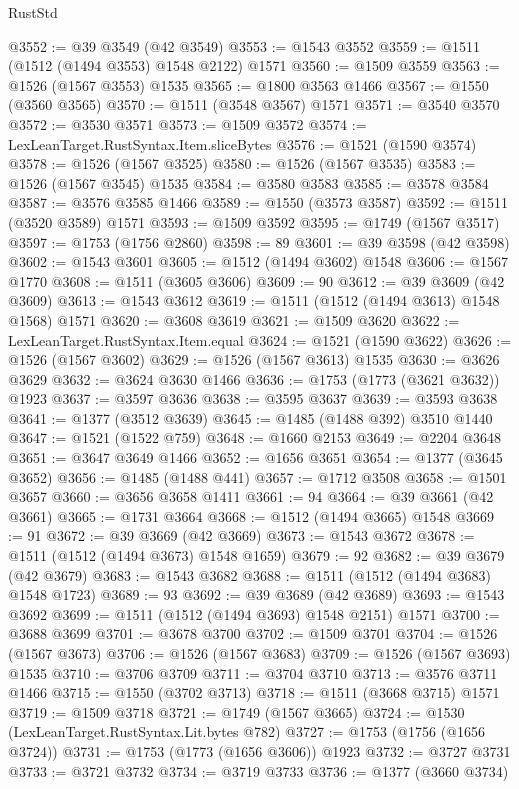\begin{lexlean}{RustStd}
\begin{coremodule}
{\begin{coremodule}
{{{{{{{{{{{{{{{{{{{{{{{{{{{{{{{{{{{@3552 := @39 @3549 (@42 @3549)
@3553 := @1543 @3552
@3559 := @1511 (@1512 (@1494 @3553) @1548 @2122) @1571
@3560 := @1509 @3559
@3563 := @1526 (@1567 @3553) @1535
@3565 := @1800 @3563 @1466
@3567 := @1550 (@3560 @3565)
@3570 := @1511 (@3548 @3567) @1571
@3571 := @3540 @3570
@3572 := @3530 @3571
@3573 := @1509 @3572
@3574 := LexLeanTarget.RustSyntax.Item.sliceBytes
@3576 := @1521 (@1590 @3574)
@3578 := @1526 (@1567 @3525)
@3580 := @1526 (@1567 @3535)
@3583 := @1526 (@1567 @3545) @1535
@3584 := @3580 @3583
@3585 := @3578 @3584
@3587 := @3576 @3585 @1466
@3589 := @1550 (@3573 @3587)
@3592 := @1511 (@3520 @3589) @1571
@3593 := @1509 @3592
@3595 := @1749 (@1567 @3517)
@3597 := @1753 (@1756 @2860)
@3598 := 89
@3601 := @39 @3598 (@42 @3598)
@3602 := @1543 @3601
@3605 := @1512 (@1494 @3602) @1548
@3606 := @1567 @1770
@3608 := @1511 (@3605 @3606)
@3609 := 90
@3612 := @39 @3609 (@42 @3609)
@3613 := @1543 @3612
@3619 := @1511 (@1512 (@1494 @3613) @1548 @1568) @1571
@3620 := @3608 @3619
@3621 := @1509 @3620
@3622 := LexLeanTarget.RustSyntax.Item.equal
@3624 := @1521 (@1590 @3622)
@3626 := @1526 (@1567 @3602)
@3629 := @1526 (@1567 @3613) @1535
@3630 := @3626 @3629
@3632 := @3624 @3630 @1466
@3636 := @1753 (@1773 (@3621 @3632)) @1923
@3637 := @3597 @3636
@3638 := @3595 @3637
@3639 := @3593 @3638
@3641 := @1377 (@3512 @3639)
@3645 := @1485 (@1488 @392) @3510 @1440
@3647 := @1521 (@1522 @759)
@3648 := @1660 @2153
@3649 := @2204 @3648
@3651 := @3647 @3649 @1466
@3652 := @1656 @3651
@3654 := @1377 (@3645 @3652)
@3656 := @1485 (@1488 @441)
@3657 := @1712 @3508
@3658 := @1501 @3657
@3660 := @3656 @3658 @1411
@3661 := 94
@3664 := @39 @3661 (@42 @3661)
@3665 := @1731 @3664
@3668 := @1512 (@1494 @3665) @1548
@3669 := 91
@3672 := @39 @3669 (@42 @3669)
@3673 := @1543 @3672
@3678 := @1511 (@1512 (@1494 @3673) @1548 @1659)
@3679 := 92
@3682 := @39 @3679 (@42 @3679)
@3683 := @1543 @3682
@3688 := @1511 (@1512 (@1494 @3683) @1548 @1723)
@3689 := 93
@3692 := @39 @3689 (@42 @3689)
@3693 := @1543 @3692
@3699 := @1511 (@1512 (@1494 @3693) @1548 @2151) @1571
@3700 := @3688 @3699
@3701 := @3678 @3700
@3702 := @1509 @3701
@3704 := @1526 (@1567 @3673)
@3706 := @1526 (@1567 @3683)
@3709 := @1526 (@1567 @3693) @1535
@3710 := @3706 @3709
@3711 := @3704 @3710
@3713 := @3576 @3711 @1466
@3715 := @1550 (@3702 @3713)
@3718 := @1511 (@3668 @3715) @1571
@3719 := @1509 @3718
@3721 := @1749 (@1567 @3665)
@3724 := @1530 (LexLeanTarget.RustSyntax.Lit.bytes @782)
@3727 := @1753 (@1756 (@1656 @3724))
@3731 := @1753 (@1773 (@1656 @3606)) @1923
@3732 := @3727 @3731
@3733 := @3721 @3732
@3734 := @3719 @3733
@3736 := @1377 (@3660 @3734)
}}}}}}}}}}}}}}}}}}}}}}}}}}}}}}}}}}}
\end{coremodule}}
\end{coremodule}
\end{lexlean}
